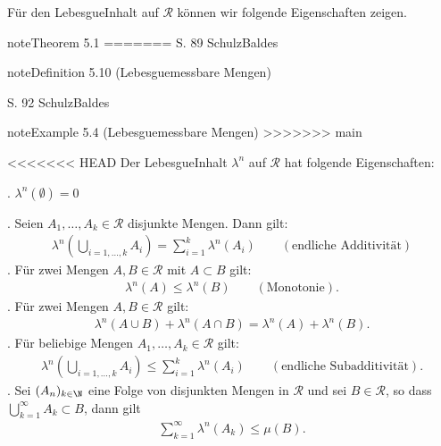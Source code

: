 \documentclass[letterpaper,10pt,english]{jupyterBook}
\begin{document}
\sphinxAtStartPar
Für den Lebesgue\sphinxhyphen{}Inhalt auf \(\mathcal{R}\) können wir folgende Eigenschaften zeigen.
\label{masstheorie/masstheorie:thm:lebesguevolume}
\begin{sphinxadmonition}{note}{Theorem 5.1}
=======
S. 89 Schulz\sphinxhyphen{}Baldes
\end{sphinxadmonition}
\label{masstheorie/masstheorie:definition-14}
\begin{sphinxadmonition}{note}{Definition 5.10 (Lebesgue\sphinxhyphen{}messbare Mengen)}



\sphinxAtStartPar
S. 92 Schulz\sphinxhyphen{}Baldes
\end{sphinxadmonition}
\label{masstheorie/masstheorie:example-15}
\begin{sphinxadmonition}{note}{Example 5.4 (Lebesgue\sphinxhyphen{}messbare Mengen)}
>>>>>>> main



\sphinxAtStartPar
<<<<<<< HEAD
Der Lebesgue\sphinxhyphen{}Inhalt \(\lambda^n\) auf \(\mathcal{R}\) hat folgende Eigenschaften:

. \(\lambda^n(\emptyset) = 0\)

. Seien \(A_1, \ldots, A_k \in \mathcal{R}\) disjunkte Mengen.
Dann gilt:
\begin{equation*}
\begin{split}\lambda^n \left( \bigcup_{i=1,\ldots,k} A_i \right) = \sum_{i=1}^k \lambda^n(A_i) \qquad (\text{endliche Additivität})\end{split}
\end{equation*}
. Für zwei Mengen \(A, B \in \mathcal{R}\) mit \(A \subset B\) gilt:
\begin{equation*}
\begin{split}\lambda^n(A) \leq \lambda^n(B) \qquad (\text{Monotonie}).\end{split}
\end{equation*}
. Für zwei Mengen \(A, B \in \mathcal{R}\) gilt:
\begin{equation*}
\begin{split}\lambda^n(A \cup B) + \lambda^n(A \cap B) = \lambda^n(A) + \lambda^n(B).\end{split}
\end{equation*}
. Für beliebige Mengen \(A_1, \ldots, A_k \in \mathcal{R}\) gilt:
\begin{equation*}
\begin{split}\lambda^n\left( \bigcup_{i=1,\ldots,k} A_i\right) \leq \sum_{i=1}^k \lambda^n(A_i) \qquad (\text{endliche Subadditivität}).\end{split}
\end{equation*}
. Sei \((A_n)_{k\in\N}\) eine Folge von disjunkten Mengen in \(\mathcal{R}\) und sei \(B \in \mathcal{R}\), so dass \(\bigcup_{k=1}^\infty A_k \subset B\), dann gilt
\begin{equation*}
\begin{split}\sum_{k=1}^\infty  \lambda^n(A_k) \leq \mu(B).\end{split}
\end{equation*}\end{sphinxadmonition}
\end{document}
